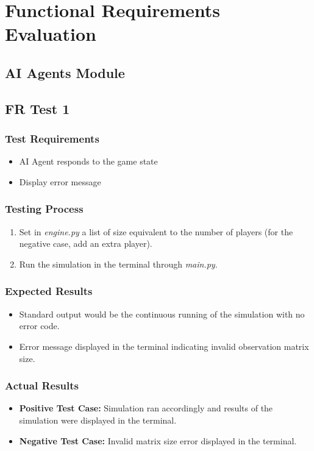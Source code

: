 \documentclass[12pt, titlepage]{article}
\providecommand{\DIFaddbegin}{} %
\providecommand{\DIFaddend}{} %
\begin{document}
\newpage


\section{Functional Requirements Evaluation}
\subsection{AI Agents Module}
\subsection{FR Test 1}\DIFaddbegin \label{FRT1} 
\DIFaddend \subsubsection{Test Requirements}
\begin{itemize}
    \item AI Agent responds to the game state 
    \item Display error message
\end{itemize}
\subsubsection{Testing Process}
\begin{enumerate}
    \item Set in \textit{engine.py} a list of size equivalent to the number of players (for the negative case, add an extra player).
    \item Run the simulation in the terminal through \textit{main.py}.
\end{enumerate}
\subsubsection{Expected Results}
\begin{itemize}
    \item Standard output would be the continuous running of the simulation with no error code.
    \item Error message displayed in the terminal indicating invalid observation matrix size.
\end{itemize}
\subsubsection{Actual Results}
\begin{itemize}
    \item \textbf{Positive Test Case:} Simulation ran accordingly and results of the simulation were displayed in the terminal.
    \item \textbf{Negative Test Case:} Invalid matrix size error displayed in the terminal.
\end{itemize}
\end{document}
